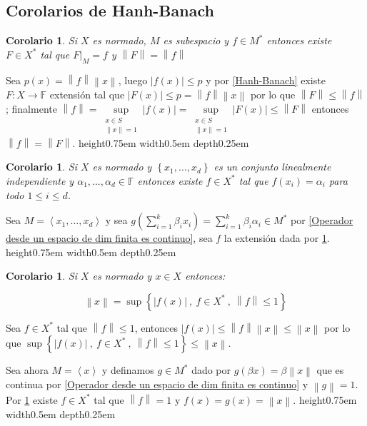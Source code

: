 \documentclass[11pt]{article}
\newcommand{\norm}[1]{\left\lVert#1\right\rVert}
\newcommand{\abs}[1]{\left\lvert#1\right\rvert}
\newcommand{\ip}[1]{\left\langle#1\right\rangle}
\newcommand{\sett}[1]{\left\lbrace#1\right\rbrace}
\numberwithin{theorem}{subsection}
\newtheorem{corollary}[theorem]{Corolario}
\newenvironment{proof}[1][Demostraci\'on]{\begin{trivlist}
		\item[\hskip \labelsep {\bfseries #1}]}{\end{trivlist}}
\newcommand{\qed}{\nobreak \ifvmode \relax \else
	\ifdim\lastskip<1.5em \hskip-\lastskip
	\hskip1.5em plus0em minus0.5em \fi \nobreak
	\vrule height0.75em width0.5em depth0.25em\fi}
\begin{document}
\subsection{Corolarios de Hanh-Banach}

\begin{corollary}
	\label{La extension del funcional preserva norma}
	Si $X$ es normado, $M$ es subespacio y $f \in M^{\ast}$ entonces existe $F \in X^{\ast}$ tal que $F \vert_{M} = f$ y $\norm{F} = \norm{f}$
\end{corollary}

\begin{proof}
	Sea $p(x) = \norm{f}\norm{x}$, luego $\abs{f(x)}\leq p$ y por \ref{Hanh-Banach} existe $F: X \rightarrow \mathbb{F}$ extensi\'on tal que $\abs{F(x)} \leq p = \norm{f} \norm{x}$  por lo que $\norm{F} \leq \norm{f}$; finalmente $\norm{f} = \sup\limits_{\substack{x \in S \\ \norm{x} = 1}} \abs{f(x)} = \sup\limits_{\substack{x \in S \\ \norm{x} = 1}} \abs{F(x)} \leq \norm{F}$ entonces $\norm{f} = \norm{F}$. \qed
\end{proof}

\begin{corollary}
	Si $X$ es normado y $\sett{x_1, \dots , x_d}$ es un conjunto linealmente independiente y $\alpha_1 , \dots , \alpha_d \in \mathbb{F}$ entonces existe $f \in X^{\ast}$ tal que $f(x_i) = \alpha_i$ para todo $1 \leq i \leq d$.
\end{corollary}

\begin{proof}
	Sea $M = \ip{x_1 , \dots , x_d}$ y sea $g( \sum\limits_{i=1}^{k}{\beta_i x_i}) = \sum\limits_{i=1}^{k}{\beta_i \alpha_i}  \in M^{\ast}$ por \ref{Operador desde un espacio de dim finita es continuo}, sea $f$ la extensi\'on dada por \ref{La extension del funcional preserva norma}. \qed
\end{proof}


\begin{corollary}
	\label{Norma en funcion de funcionales}
	Si $X$ es normado y $x \in X$ entonces:
	
	\begin{equation}
		\label{eq: Norma en funcion de funcionales}
		\norm{x} = \sup \sett{\abs{f(x)} \ , \ f \in X^{\ast} \ , \ \norm{f} \leq 1}
	\end{equation}
\end{corollary}

\begin{proof}
	Sea $f \in X^{\ast}$ tal que $\norm{f} \leq 1$, entonces $\abs{f(x)} \leq \norm{f}\norm{x} \leq \norm{x}$ por lo que $\sup \sett{\abs{f(x)} \ , \ f \in X^{\ast} \ , \ \norm{f} \leq 1} \leq \norm{x}$.
	
	Sea ahora $M = \ip{x}$ y definamos $g \in M^{\ast}$ dado por $g(\beta x) = \beta \norm{x}$ que es continua por \ref{Operador desde un espacio de dim finita es continuo} y $\norm{g} = 1$. Por \ref{La extension del funcional preserva norma} existe $f \in X^{\ast}$ tal que $\norm{f}=1$ y $f(x) = g(x) = \norm{x}$. \qed
\end{proof}
\end{document}
